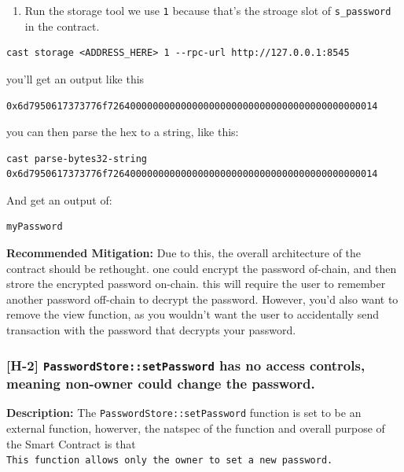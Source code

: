 \documentclass[
  paper=a4,
  ,captions=tableheading
]{scrartcl}
\providecommand{\tightlist}{%
  \setlength{\itemsep}{0pt}\setlength{\parskip}{0pt}}
\begin{document}
\begin{enumerate}
\def\labelenumi{\arabic{enumi}.}
\setcounter{enumi}{2}
\tightlist
\item
  Run the storage tool we use \texttt{1} because that's the stroage slot
  of \texttt{s\_password} in the contract.
\end{enumerate}

\begin{verbatim}
cast storage <ADDRESS_HERE> 1 --rpc-url http://127.0.0.1:8545
\end{verbatim}

you'll get an output like this

\texttt{0x6d7950617373776f726400000000000000000000000000000000000000000014}

you can then parse the hex to a string, like this:

\begin{verbatim}
cast parse-bytes32-string 0x6d7950617373776f726400000000000000000000000000000000000000000014
\end{verbatim}

And get an output of:

\begin{verbatim}
myPassword
\end{verbatim}

\textbf{Recommended Mitigation:} Due to this, the overall architecture
of the contract should be rethought. one could encrypt the password
of-chain, and then strore the encrypted password on-chain. this will
require the user to remember another password off-chain to decrypt the
password. However, you'd also want to remove the view function, as you
wouldn't want the user to accidentally send transaction with the
password that decrypts your password.

\subsubsection{\texorpdfstring{{[}H-2{]}
\texttt{PasswordStore::setPassword} has no access controls, meaning
non-owner could change the
password.}{{[}H-2{]} PasswordStore::setPassword has no access controls, meaning non-owner could change the password.}}\label{h-2-passwordstoresetpassword-has-no-access-controls-meaning-non-owner-could-change-the-password.}

\textbf{Description:} The \texttt{PasswordStore::setPassword} function
is set to be an external function, howerver, the natspec of the function
and overall purpose of the Smart Contract is that
\texttt{This\ function\ allows\ only\ the\ owner\ to\ set\ a\ new\ password.}
\end{document}
